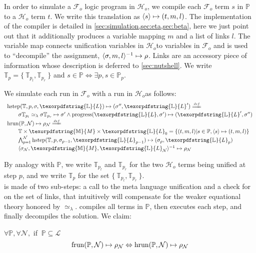 \documentclass[sigconf,natbib=false,review]{acmart}
\newcommand{\UnifRel}{\ensuremath{\simeq}}
\newcommand{\Ue}{\ensuremath{\UnifRel_\lambda}\xspace}
\newcommand{\llambda}{\ensuremath{\mathcal{L}}\xspace}
\newcommand{\Fo}{\texorpdfstring{\ensuremath{\mathcal{F}_{\!o}\xspace}}{Fo}} %
\newcommand{\Ho}{\texorpdfstring{\ensuremath{\mathcal{H}_o}\xspace}{Ho}}
\newcommand{\linkStore}{\texorpdfstring{\ensuremath{\mathbb{L}}\xspace}{L}}
\newcommand{\mapStore}{\texorpdfstring{\ensuremath{\mathbb{M}}\xspace}{M}}
\newcommand{\foUnifPb}{\ensuremath{\mathbb{P}}\xspace}
\newcommand{\hoUnifPb}{\ensuremath{\mathbb{T}}\xspace}
\begin{document}
\noindent
In order to simulate a \Fo{} logic program in \Ho{}, we compile
each \Fo{} term $s$ in \foUnifPb to a \Ho{} term $t$.
We write this translation as $\langle s \rangle\mapsto(t,m,l)$. The implementation of the compiler
is detailed in \cref{sec:simulation,sec:eta,sec:beta}, here we just point
out that it additionally produces a variable mapping $m$ and a list of links $l$.
The variable map connects unification variables in \Ho to variables
in \Fo{} and is used to ``decompile'' the assignment,
$\langle \sigma,m,l \rangle^{-1}\mapsto \rho$. Links are an accessory piece of information whose
description is deferred to \cref{sec:nutshell}.
We write $\hoUnifPb_p = \{~ \hoUnifPb_{p_l}, \hoUnifPb_{p_r} ~\}$
and $s \in \foUnifPb \Leftrightarrow \exists p, s \in \foUnifPb_p$.

We simulate each run in \Fo{} with a run in \Ho as follows:
%
$$
\begin{array}{l}
\stepH{\hoUnifPb}{p}{\sigma}{\linkStore}{\sigma''}{\linkStore'} \deff\vspace{2pt}\\
  \qquad\stepHD{\hoUnifPb}{p}{\sigma}{\sigma'}{\sigma''}{\linkStore}\vspace{2pt}\\
  \runH{\foUnifPb}{\mathcal{N}}{\rho} \deff \vspace{2pt}\\
  \qquad \hoUnifPb \times \mapStore \times \linkStore_0 = \{ (t,m,l) | s \in \foUnifPb, \C{s}{t}{m}{l} \}\vspace{2pt}\\
  \qquad \runHD{\hoUnifPb}{\mathcal{N}}{\linkStore}\vspace{2pt}\\
  \qquad \D{\sigma_{\mathcal{N}}}{\mapStore}{\linkStore_{\mathcal{N}}}{\rho_{\mathcal{N}}}
\end{array}
$$

\noindent
By analogy with \foUnifPb, we write $\hoUnifPb_{p_l}$ and $\hoUnifPb_{p_r}$
for the two \Ho{} terms being unified at step $p$, and we write $\hoUnifPb_p$
for the set $\{~ \hoUnifPb_{p_l}, \hoUnifPb_{p_r} ~\}$.\\
\hstep{} is made of two sub-steps: a call to the meta language
unification and a check for \progress{} on the set of links, that intuitively
will compensate for the weaker equational theory honored by \Ue.
\hrun{} compiles all terms in \foUnifPb{}, then executes each step, and
finally decompiles the solution.
We claim:

\begin{proposition}[Simulation]\label{prop:simulation}
$\forall \foUnifPb, \forall \mathcal{N},$ if $~\foUnifPb \subseteq \llambda$
$$
  \runF{\foUnifPb}{\mathcal{N}}{\rho}
  \Leftrightarrow
  \runH{\foUnifPb}{\mathcal{N}}{\rho}
$$
\end{proposition}
\end{document}
